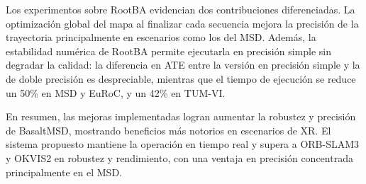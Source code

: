 Los experimentos sobre RootBA evidencian dos contribuciones diferenciadas. La optimización global del mapa al finalizar cada secuencia mejora la precisión de la trayectoria principalmente en escenarios como los del MSD. Además, la estabilidad numérica de RootBA permite ejecutarla en precisión simple sin degradar la calidad: la diferencia en ATE entre la versión en precisión simple y la de doble precisión es despreciable, mientras que el tiempo de ejecución se reduce un 50\% en MSD y EuRoC, y un 42\% en TUM-VI.

En resumen, las mejoras implementadas logran aumentar la robustez y precisión de BasaltMSD, mostrando beneficios más notorios en escenarios de XR. El sistema propuesto mantiene la operación en tiempo real y supera a ORB-SLAM3 y OKVIS2 en robustez y rendimiento, con una ventaja en precisión concentrada principalmente en el MSD.
